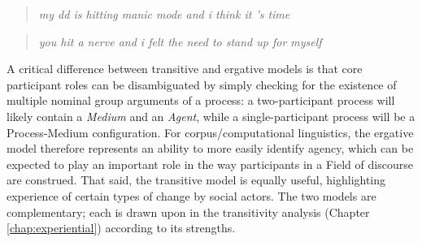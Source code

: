 \begin{multicols}{2}
\begin{quote}
\small
\noindent {}

\noindent \emph{my dd is hitting manic mode and i think it 's time} 
\end{quote}

\begin{quote}
\small
\noindent {}

\noindent \emph{you hit a nerve and i felt the need to stand up for myself} %
\end{quote}
\end{multicols}
%
\noindent A critical difference between transitive and ergative models is that core participant roles can be disambiguated by simply checking for the existence of multiple nominal group arguments of a process: a two\hyp{}participant process will likely contain a \emph{Medium} and an \emph{Agent}, while a single\hyp{}participant process will be a Process\hyp{}Medium configuration. For corpus\slash computational linguistics, the ergative model therefore represents an ability to more easily identify agency, which can be expected to play an important role in the way participants in a Field of discourse are construed. That said, the transitive model is equally useful, highlighting experience of certain types of change by social actors. The two models are complementary; each is drawn upon in the transitivity analysis (Chapter \ref{chap:experiential}) according to its strengths.





